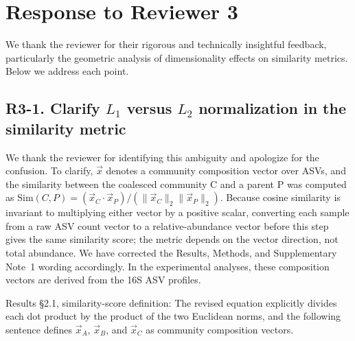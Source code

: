 \section*{Response to Reviewer 3}

We thank the reviewer for their rigorous and technically insightful feedback, particularly the geometric analysis of dimensionality effects on similarity metrics. Below we address each point.

\subsection*{R3-1. Clarify $L_1$ versus $L_2$ normalization in the similarity metric}


\responselabel
We thank the reviewer for identifying this ambiguity and apologize for the confusion. To clarify, $\vec{x}$ denotes a community composition vector over ASVs, and the similarity between the coalesced community C and a parent P was computed as $\mathrm{Sim}(C,P) = (\vec{x}_C \cdot \vec{x}_P)/(\|\vec{x}_C\|_2\|\vec{x}_P\|_2)$. Because cosine similarity is invariant to multiplying either vector by a positive scalar, converting each sample from a raw ASV count vector to a relative-abundance vector before this step gives the same similarity score; the metric depends on the vector direction, not total abundance. We have corrected the Results, Methods, and Supplementary Note~1 wording accordingly. In the experimental analyses, these composition vectors are derived from the 16S ASV profiles.


Results \S2.1, similarity-score definition:  The revised equation explicitly divides each dot product by the product of the two Euclidean norms, and the following sentence defines $\vec{x}_A$, $\vec{x}_B$, and $\vec{x}_C$ as community composition vectors.

